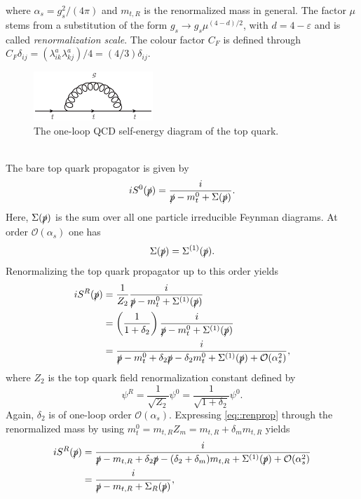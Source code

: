 \documentclass[a4paper,12pt]{book}
\begin{document}
where $\alpha_s = g_s^2/(4\pi)$ and $m_{t,R}$ is the renormalized mass in general. The factor $\mu$ stems from a substitution of the form $g_s \rightarrow g_s \mu^{(4-d)/2}$, with $d=4-\varepsilon$ and is called \textit{renormalization scale}. The colour factor $C_F$ is defined through $C_F \delta_{ij} = (\lambda^a_{ik} \lambda^a_{kj})/4 = (4/3) \delta_{ij}$.
\begin{figure}[h]
\begin{center}
\includegraphics[width=0.4\textwidth]{src/feynman/qcd1Lselfenergy.ps}
\caption{The one-loop QCD self-energy diagram of the top quark.}
\label{fig::qcd1Lselfenergy}
\end{center}
\end{figure}\\
The bare top quark propagator is given by 
\begin{equation}
iS^0(\slashed{p})=\frac{i}{\slashed{p}-m_t^0+\Sigma(\slashed{p})}.
\end{equation}
Here, $\Sigma(\slashed{p})$ is the sum over all one particle irreducible Feynman diagrams. At order $\mathcal{O}(\alpha_s)$ one has 
\begin{equation}
\Sigma(\slashed{p})=\Sigma^{(1)}(\slashed{p}). 
\end{equation}
Renormalizing the top quark propagator up to this order yields
\begin{align}
iS^R(\slashed{p})&=\frac{1}{Z_2}\frac{i}{\slashed{p}-m_t^0+\Sigma^{(1)}(\slashed{p})}\\
&=\left(\frac{1}{1+\delta_2}\right)\frac{i}{\slashed{p}-m_t^0+\Sigma^{(1)}(\slashed{p})}\\
\label{eq::renprop}
&=\frac{i}{\slashed{p}-m_t^0+\delta_2\slashed{p}-\delta_2 m_t^0+\Sigma^{(1)}(\slashed{p})+\mathcal{O}(\alpha_s^2)},
\end{align}
where $Z_2$ is the top quark field renormalization constant defined by
\begin{equation}
\psi^R = \frac{1}{\sqrt{Z_2}}\psi^0 = \frac{1}{\sqrt{1+\delta_2}}\psi^0.
\end{equation}
Again, $\delta_2$ is of one-loop order $\mathcal{O}(\alpha_s)$. Expressing \eqref{eq::renprop} through the renormalized mass by using $m_t^0= m_{t,R} Z_m = m_{t,R} + \delta_m m_{t,R}$ yields
\begin{align}
iS^R(\slashed{p})&=\frac{i}{\slashed{p}-m_{t,R}+\delta_2\slashed{p}-(\delta_2+\delta_m) m_{t,R}+\Sigma^{(1)}(\slashed{p})+\mathcal{O}(\alpha_s^2)}\\
\label{eq::proppole}
&= \frac{i}{\slashed{p}-m_{t,R}+\Sigma_R(\slashed{p})},
\end{align}
\end{document}
